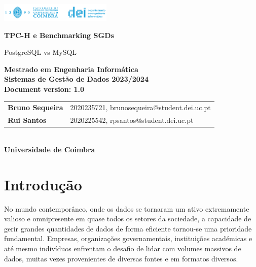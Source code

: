 \documentclass{article}
\begin{document}
\begin{titlepage}
    \centering
    \vspace*{1cm}

    \includegraphics[width=0.4\textwidth]{dei_thumb.png} %

    \vspace{1.5cm}
    {\LARGE \textbf{TPC-H e Benchmarking SGDs} \par}
   
    {\Large PostgreSQL vs MySQL \par}

    \vspace{2.5cm}
    \textbf{Mestrado em Engenharia Informática} \\
    \textbf{Sistemas de Gestão de Dados 2023/2024} \\
    \vspace{0.5cm} 
    \textbf{Document version: 1.0} \\
    \vspace{3cm}
    \begin{tabular}{ll}
        \textbf{Bruno Sequeira} & 2020235721, brunosequeira@student.dei.uc.pt \\
        \textbf{Rui Santos} & 2020225542, rpsantos@student.dei.uc.pt
        
      
    \end{tabular}\\
    \vspace{1.5cm} 
    \textbf{Universidade de Coimbra}

    \date{}

    \vfill

\end{titlepage}
   \clearpage
   \tableofcontents
   \clearpage
   \listoffigures
   \listoftables

\clearpage
\section{Introdução}
\texttt{}\par No mundo contemporâneo, onde os dados se tornaram um ativo extremamente valioso e omnipresente em quase todos os setores da sociedade, a capacidade de gerir grandes quantidades de dados de forma eficiente tornou-se uma prioridade fundamental. Empresas, organizações governamentais, instituições académicas e até mesmo indivíduos enfrentam o desafio de lidar com volumes massivos de dados, muitas vezes provenientes de diversas fontes e em formatos diversos.\\
\end{document}
